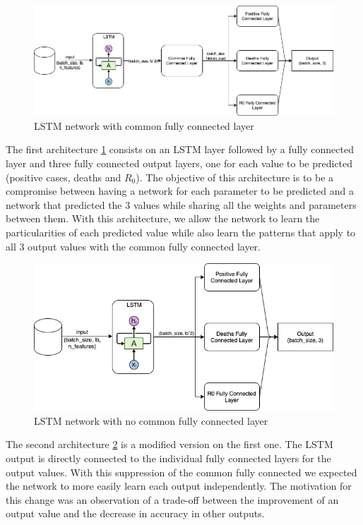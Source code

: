 \documentclass[anon]{CI}
\begin{document}
\begin{figure}[!ht]
    \center
    \includegraphics[width=\linewidth]{Networks-LSTM-Hidden}
    \caption{\label{fig:LSTM-hidden}LSTM network with common fully connected layer}
\end{figure}

The first architecture \ref{fig:LSTM-hidden} consists on an LSTM layer followed by a fully connected layer and three fully connected output layers, one for each value to be predicted (positive cases, deaths and $R_0$). The objective of this architecture is to be a compromise between having a network for each parameter to be predicted and a network that predicted the 3 values while sharing all the weights and parameters between them. With this architecture, we allow the network to learn the particularities of each predicted value while also learn the patterns that apply to all 3 output values with the common fully connected layer.

\begin{figure}[!ht]
    \center
    \includegraphics[width=\linewidth]{Networks-LSTM-NoHidden}
    \caption{\label{fig:LSTM-nohidden}LSTM network with no common fully connected layer}
\end{figure}

The second architecture \ref{fig:LSTM-nohidden} is a modified version on the first one. The LSTM output is directly connected to the individual fully connected layers for the output values. With this suppression of the common fully connected we expected the network to more easily learn each output independently. The motivation for this change was an observation of a trade-off between the improvement of an output value and the decrease in accuracy in other outputs.
\end{document}
